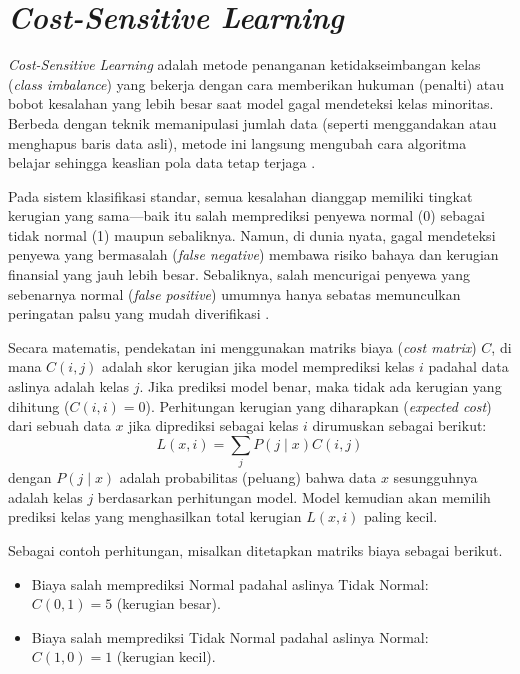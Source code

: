 \section{\textit{Cost-Sensitive Learning}}\label{sec:cost_sensitive}

\textit{Cost-Sensitive Learning} adalah metode penanganan ketidakseimbangan kelas (\textit{class imbalance}) yang bekerja dengan cara memberikan hukuman (penalti) atau bobot kesalahan yang lebih besar saat model gagal mendeteksi kelas minoritas. Berbeda dengan teknik memanipulasi jumlah data (seperti menggandakan atau menghapus baris data asli), metode ini langsung mengubah cara algoritma belajar sehingga keaslian pola data tetap terjaga \cite{he2009learning}.

Pada sistem klasifikasi standar, semua kesalahan dianggap memiliki tingkat kerugian yang sama—baik itu salah memprediksi penyewa normal (0) sebagai tidak normal (1) maupun sebaliknya. Namun, di dunia nyata, gagal mendeteksi penyewa yang bermasalah (\textit{false negative}) membawa risiko bahaya dan kerugian finansial yang jauh lebih besar. Sebaliknya, salah mencurigai penyewa yang sebenarnya normal (\textit{false positive}) umumnya hanya sebatas memunculkan peringatan palsu yang mudah diverifikasi \cite{elkan2001foundations}.

Secara matematis, pendekatan ini menggunakan matriks biaya (\textit{cost matrix}) $C$, di mana $C(i, j)$ adalah skor kerugian jika model memprediksi kelas $i$ padahal data aslinya adalah kelas $j$. Jika prediksi model benar, maka tidak ada kerugian yang dihitung ($C(i, i) = 0$). Perhitungan kerugian yang diharapkan (\textit{expected cost}) dari sebuah data $x$ jika diprediksi sebagai kelas $i$ dirumuskan sebagai berikut:
$$
L(x, i) = \sum_{j} P(j \mid x) C(i, j)
$$
dengan $P(j \mid x)$ adalah probabilitas (peluang) bahwa data $x$ sesungguhnya adalah kelas $j$ berdasarkan perhitungan model. Model kemudian akan memilih prediksi kelas yang menghasilkan total kerugian $L(x, i)$ paling kecil.

Sebagai contoh perhitungan, misalkan ditetapkan matriks biaya sebagai berikut.
\begin{itemize}
    \item Biaya salah memprediksi Normal padahal aslinya Tidak Normal: $C(0, 1) = 5$ (kerugian besar).
    \item Biaya salah memprediksi Tidak Normal padahal aslinya Normal: $C(1, 0) = 1$ (kerugian kecil).
\end{itemize}

